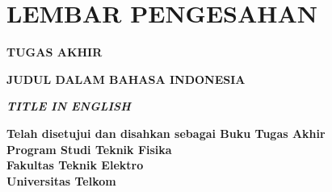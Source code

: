 

\chapter*{\MakeUppercase{Lembar Pengesahan}}


\begin{center}

\large\MakeUppercase{\textbf{Tugas Akhir}}

\vspace{2em}

\large\MakeUppercase{\textbf{Judul dalam Bahasa Indonesia}}\\

\vspace{2em}

\large\MakeUppercase{\textbf{\textit{Title in English}}}\\

\vspace{2em}

\normalsize \textbf{Telah disetujui dan disahkan sebagai Buku Tugas Akhir}\\

\textbf{Program Studi Teknik Fisika}\\

\textbf{Fakultas Teknik Elektro}\\

\textbf{Universitas Telkom}\\

\vspace{2em}


\end{center}
